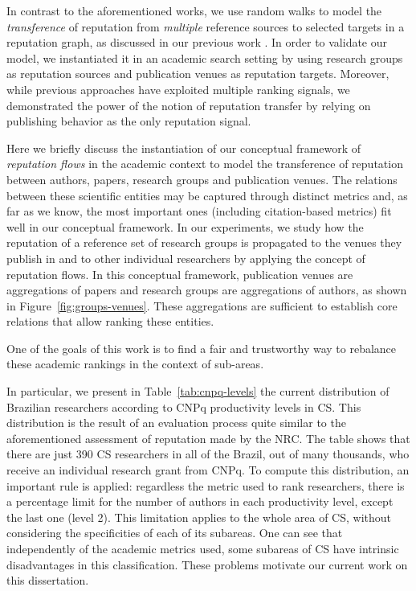 In contrast to the aforementioned works, we use random walks to model the \textit{transference} of reputation from \textit{multiple} reference sources to selected targets in a reputation graph, as discussed in our previous work \cite{ribas2015random}. In order to validate our model, we instantiated it in an academic search setting by using research groups as reputation sources and publication venues as reputation targets. Moreover, while previous approaches have exploited multiple ranking signals, we demonstrated the power of the notion of reputation transfer by relying on publishing behavior as the only reputation signal.

Here we briefly discuss the instantiation of our conceptual framework of {\em reputation flows} in the academic context to model the transference of reputation between authors, papers, research groups and publication venues. The relations between these scientific entities may be captured through distinct metrics and, as far as we know, the most important ones (including citation-based metrics) fit well in our conceptual framework. In our experiments, we study how the reputation of a reference set of research groups is propagated to the venues they publish in and to other individual researchers by applying the concept of reputation flows. In this conceptual framework, publication venues are aggregations of papers and research groups are aggregations of authors, as shown in Figure~\ref{fig:groups-venues}. These aggregations are sufficient to establish core relations that allow ranking these entities.

One of the goals of this work is to find a fair and trustworthy way to rebalance these academic rankings in the context of sub-areas. 


In particular, we present in Table~\ref{tab:cnpq-levels} the current distribution of Brazilian researchers according to CNPq productivity levels in CS. This distribution is the result of an evaluation process quite similar to the aforementioned assessment of reputation made by the NRC. The table shows that there are just 390 CS researchers in all of the Brazil, out of many thousands, who receive an individual research grant from CNPq. 
%
To compute this distribution, an important rule is applied: regardless the metric used to rank researchers, there is a percentage limit for the number of authors in each productivity level, except the last one (level 2). This limitation applies to the whole area of CS, without considering the specificities of each of its subareas. One can see that independently of the academic metrics used, some subareas of CS have intrinsic disadvantages in this classification. These problems motivate our current work on this dissertation.


